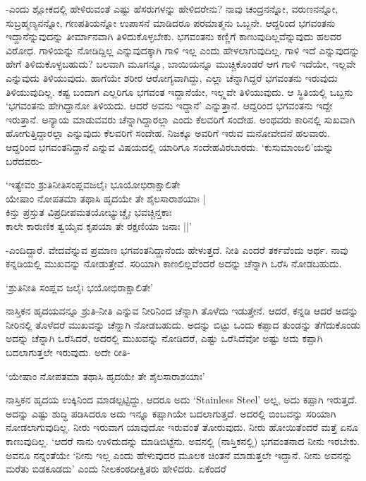 -ಎಂದು ಶ್ಲೋಕದಲ್ಲಿ ಹೇಳಿರುವಂತೆ ಎಷ್ಟು ಹೆಸರುಗಳನ್ನು ಹೇಳಿದರೇನು? ನಾವು ಚಂದ್ರನನ್ನೋ, ವರುಣನನ್ನೋ, ಸುಬ್ರಹ್ಮಣ್ಯನನ್ನೋ, ಗಣಪತಿಯನ್ನೋ ಉಪಾಸನೆ ಮಾಡಿದರೂ ಪರಮಾತ್ಮನು ಒಬ್ಬನೇ. ಆದ್ದರಿಂದ ಭಗವಂತನು ಇದ್ದಾನೆನ್ನುವುದನ್ನು ತೀರ್ಮಾನವಾಗಿ ತಿಳಿದುಕೊಳ್ಳಬೇಕು. ಭಗವಂತನು ಕಣ್ಣಿಗೆ ಕಾಣುವುದಿಲ್ಲವೆನ್ನುವುದು ಹಲವರ ವಿರೋಧ. ಗಾಳಿಯನ್ನು ನೋಡಿದ್ದಿಲ್ಲ ಎನ್ನುವುದಕ್ಕಾಗಿ ಗಾಳಿ ಇಲ್ಲ ಎಂದು ಹೇಳಲಾಗುವುದಿಲ್ಲ. ಗಾಳಿ ಇದೆ ಎನ್ನುವುದನ್ನು ಹೇಗೆ ತಿಳಿದುಕೊಳ್ಳಬಹುದು? ಬಲವಾಗಿ ಮೂಗನ್ನೂ, ಬಾಯಿಯನ್ನೂ ಮುಚ್ಚಿಕೊಂಡರೆ ಆಗ ಗಾಳಿ ಇದೆಯೇ, ಇಲ್ಲವೇ ಎನ್ನುವುದು ತಿಳಿಯುವುದು. ಹಾಗೆಯೇ ಶರೀರ ಆರೋಗ್ಯವಾಗಿದ್ದು, ಎಲ್ಲಾ ಚೆನ್ನಾಗಿದ್ದರೆ ಭಗವಂತನು ಇರುವುದು ತಿಳಿಯುವುದಿಲ್ಲ. ಕಷ್ಟ ಬಂದಾಗ ಎಲ್ಲರಿಗೂ ಭಗವಂತ ಇದ್ದಾನೆಯೇ, ಇಲ್ಲ್ಲವೇ ತಿಳಿಯುವುದು. ಆ ಸ್ಥಿತಿಯಲ್ಲಿ ಒಬ್ಬನು `ಭಗವಂತನು ಹೇಗಿದ್ದಾನೋ ತಿಳಿಯದು. ಆದರೆ ಅವನು ಇದ್ದಾನೆ' ಎನ್ನುತ್ತಾನೆ. ಆದ್ದರಿಂದ ಭಗವಂತನು ಇದ್ದೇ ಇರುತ್ತಾನೆ. ಅನ್ಯಾಯ ಮಾಡುವವರು ಚೆನ್ನಾಗಿದ್ದಾರಲ್ಲಾ ಎಂದು ಕೆಲವರಿಗೆ ಸಂದೇಹ. ಅಂಥವರು ಕಾರಿನಲ್ಲಿ ಸುಖವಾಗಿ ಹೋಗುತ್ತಿದ್ದಾರಲ್ಲಾ ಎನ್ನುವುದು ಕೆಲವರಿಗೆ ಸಂದೇಹ. ನಿಜಕ್ಕೂ ಅವರಿಗೆ ಇರುವ ಮನೋವೇದನೆ ಹಲವಾರು. ಆದ್ದರಿಂದ ಭಗವಂತನಿದ್ದಾನೆ ಎನ್ನುವ ವಿಷಯದಲ್ಲಿ ಯಾರಿಗೂ ಸಂದೇಹವಿರಬಾರದು. `ಕುಸುಮಾಂಜಲಿ'ಯನ್ನು ಬರೆದವರು-

\begin{shloka}
`ಇತ್ಯೇವಂ ಶ್ರುತಿನೀತಿಸಂಪ್ಲವಜಲೈಃ ಭೂಯೋಭಿರಾಕ್ಷಾಲಿತೇ\\
ಯೇಷಾಂ ನೋಪತಮಾ ತಥಾಸಿ ಹೃದಯೇ ತೇ ಶೈಲಸಾರಾಶಯಾಃ |\\
ಕಿನ್ತು ಪ್ರಸ್ತುತ ವಿಪ್ರದೀಪಮತಯೋಭ್ಯುಚ್ಚೈಃ ಭವಚ್ಚಿನ್ತಕಾಃ\\
ಕಾಲೇ ಕಾರುಣಿಕ ತ್ವಯೈವ ಕೃಪಯಾ ತೇ ರಕ್ಷಣಿಯಾ ಜನಾಃ ||'
\end{shloka}

-ಎಂದಿದ್ದಾರೆ. ವೇದವೆನ್ನುವ ಪ್ರಮಾಣ ಭಗವಂತನಿದ್ದಾನೆಂದು ಹೇಳುತ್ತದೆ. ನೀತಿ ಎಂದರೆ ತರ್ಕವೆಂದು ಅರ್ಥ. ನಾವು ಕನ್ನಡಿಯಲ್ಲಿ ಮುಖವನ್ನು ನೋಡುತ್ತೇವೆ. ಸರಿಯಾಗಿ ಕಾಣಲಿಲ್ಲವೆಂದರೆ ಅದನ್ನು ಚೆನ್ನಾಗಿ ಒರೆಸಿ ನೋಡಬಹುದು.

\begin{shloka}
`ಶ್ರುತಿನೀತಿ ಸಂಪ್ಲವ ಜಲೈಃ ಭಯೋಭಿರಾಕ್ಷಾಲಿತೇ'
\end{shloka}

ನಾಸ್ತಿಕನ ಹೃದಯವನ್ನೂ ಶ್ರುತಿ-ನೀತಿ ಎನ್ನುವ ನೀರಿನಿಂದ ಚೆನ್ನಾಗಿ ತೊಳೆದು ಇಡುತ್ತೇನೆ. ಆದರೆ, ಕನ್ನಡಿ ಆದರೆ ಅದನ್ನು ನೀರಿನಲ್ಲಿ ತೊಳೆದರೆ ಮುಖವನ್ನು ಚೆನ್ನಾಗಿ ನೋಡಬಹುದು. ಅದನ್ನು ಬಿಟ್ಟು ಒಂದು ಕಪ್ಪಾದ ತುಂಡನ್ನು ತೆಗೆದುಕೊಂಡು ಅದನ್ನು ಚೆನ್ನಾಗಿ ಒರೆಸಿದರೆ, ಅದರಲ್ಲಿ ಮುಖವನ್ನು ನೋಡಿದರೆ, ಎಷ್ಟು ಒರೆಸಿದೆವೋ ಅಷ್ಟು ಅದು ಕಪ್ಪಾಗಿ ಬದಲಾಗುತ್ತಲೇ ಇರುವುದು. ಅದೇ ರೀತಿ-

\begin{shloka}
`ಯೇಷಾಂ ನೋಪತಮಾ ತಥಾಸಿ ಹೃದಯೇ ತೇ ಶೈಲಸಾರಾಶಯಾಃ'
\end{shloka}

ನಾಸ್ತಿಕನ ಹೃದಯ ಉಕ್ಕಿನಿಂದ ಮಾಡಲ್ಪಟ್ಟಿದ್ದು, ಆದರೂ ಅದು `{\eng Stainless Steel}' ಅಲ್ಲ, ಅದು ಕಪ್ಪಾಗಿ ಇರುತ್ತದೆ. ಅದನ್ನು ಎಷ್ಟು ಶುದ್ಧಿ ಪಡಿಸಿದರೂ ಅದು ಇನ್ನೂ ಕಪ್ಪಾಗಿಯೇ ಬದಲಾಗುತ್ತದೆ. ಅದರಲ್ಲಿ ಬಿಂಬವನ್ನು ಸರಿಯಾಗಿ ನೋಡಲಾಗುವುದಿಲ್ಲ. ನೀರು ಇರುವಾಗ ಯಾವುದೋ ಇರುವಂತೆ ತೋರುವುದು. ನೀರು ಹೋಯಿತೆಂದರೆ ಮತ್ತೆ ಏನೂ ಕಾಣುವುದಿಲ್ಲ. `ಆದರೆ ನಾನು ಉಳಿದುದನ್ನು ಮಾಡಿಬಿಟ್ಟೆನು. ಅವನಲ್ಲಿ (ನಾಸ್ತಿಕನಲ್ಲಿ) ಭಗವಂತನಾದ ನೀನು ಇರಬೇಕು. ಅವನೂ ನನ್ನಂತೆಯೇ `ನೀನು ಇಲ್ಲ ಎಂದು ಹೇಳುವುದರ ಮೂಲಕ ಚಿಂತನೆ ಮಾಡುತ್ತಲೇ ಇದ್ದಾನೆ. ನೀನು ಅವನನ್ನು ಮರೆತು ಬಿಡಕೂಡದು' ಎಂದು ನೀಲಕಂಠದೀಕ್ಷಿತರು ಹೇಳಿದರು. ಏಕೆಂದರೆ


